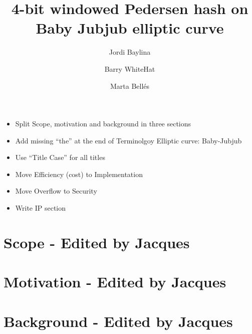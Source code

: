 \documentclass[11pt]{article}
\title{4-bit windowed Pedersen hash on Baby Jubjub elliptic curve}
\author[1]{Jordi Baylina}
\author[2]{Barry WhiteHat}
\author[1,3]{Marta Bellés}
\affil[1]{iden3}
\affil[2]{Ethereum foundation}
\affil[3]{Universitat Pompeu Fabra}
\date{} %
\begin{document}
	{\maketitle}
	\vspace{-0.2cm}
    {\color{purple}{\bf Jacques:}
        \begin{itemize}
            \item Split Scope, motivation and background in three sections
			\item Add missing ``the'' at the end of Terminolgoy Elliptic curve: Baby-Jubjub
			\item Use ``Title Case'' for all titles
			\item Move Efficiency (cost) to Implementation
			\item Move Overflow to Security
			\item Write IP section
        \end{itemize}
    }
	\tableofcontents
	
	
	\newpage

    \section{Scope {\color{purple} - Edited by Jacques}}
        
	\section{Motivation {\color{purple} - Edited by Jacques}}
        
    \section{Background {\color{purple} - Edited by Jacques}}
        
\end{document}
